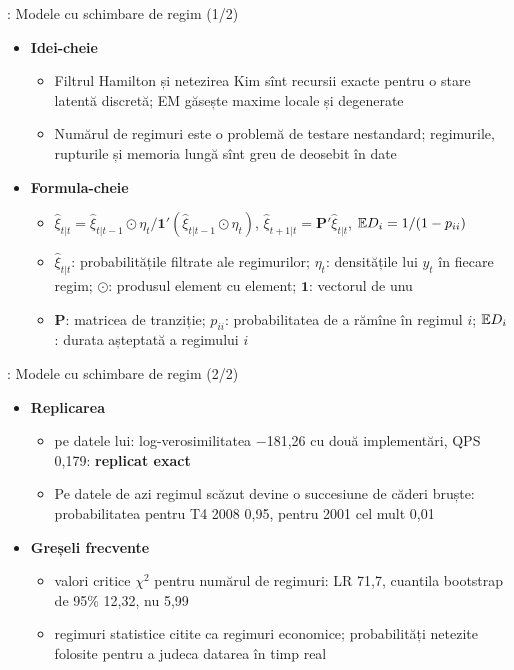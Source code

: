 \begin{frame}{: Modele cu schimbare de regim (1/2)}
\itemsize{\footnotesize}
\begin{itemize}
    \item \textbf{Idei-cheie}
    \begin{itemize}
        \item Filtrul Hamilton și netezirea Kim sînt recursii exacte pentru o stare latentă discretă; EM găsește maxime locale și degenerate
        \item Numărul de regimuri este o problemă de testare nestandard; regimurile, rupturile și memoria lungă sînt greu de deosebit în date
    \end{itemize}
    \item \textbf{Formula-cheie}
    \begin{itemize}
        \item $\hat\xi_{t|t} = \hat\xi_{t|t-1}\odot\eta_t/\mathbf 1'(\hat\xi_{t|t-1}\odot\eta_t)$, $\hat\xi_{t+1|t} = \mathbf P'\hat\xi_{t|t}$, $\mathbb{E} D_i = 1/(1 - p_{ii})$
        \item $\hat\xi_{t|t}$: probabilitățile filtrate ale regimurilor; $\eta_t$: densitățile lui $y_t$ în fiecare regim; $\odot$: produsul element cu element; $\mathbf 1$: vectorul de unu
        \item $\mathbf P$: matricea de tranziție; $p_{ii}$: probabilitatea de a rămîne în regimul $i$; $\mathbb{E} D_i$: durata așteptată a regimului $i$
    \end{itemize}
\end{itemize}
\end{frame}

\begin{frame}{: Modele cu schimbare de regim (2/2)}
\itemsize{\small}
\begin{itemize}
    \item \textbf{Replicarea}
    \begin{itemize}
        \item {} pe datele lui: log-verosimilitatea \ensuremath{-}181{,}26 cu două implementări, QPS 0{,}179: \textbf{replicat exact}
        \item Pe datele de azi regimul scăzut devine o succesiune de căderi bruște: probabilitatea pentru T4 2008 0{,}95, pentru 2001 cel mult 0{,}01
    \end{itemize}
    \item \textbf{Greșeli frecvente}
    \begin{itemize}
        \item valori critice $\chi^2$ pentru numărul de regimuri: LR 71{,}7, cuantila bootstrap de 95\% 12{,}32, nu 5{,}99
        \item regimuri statistice citite ca regimuri economice; probabilități netezite folosite pentru a judeca datarea în timp real
    \end{itemize}
\end{itemize}
\end{frame}

